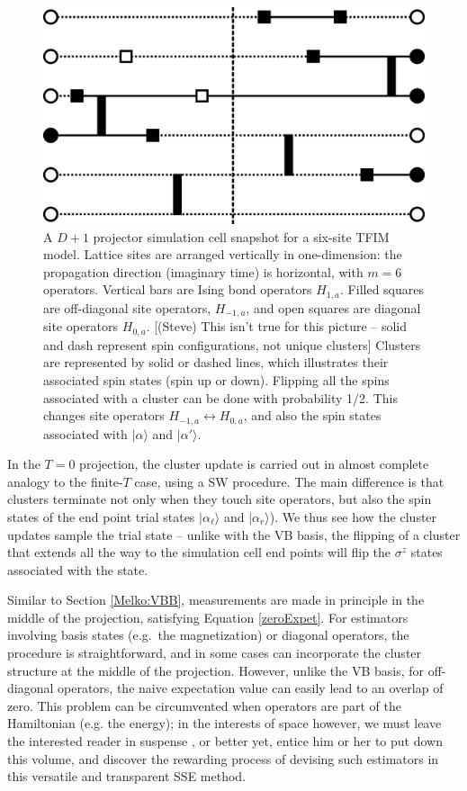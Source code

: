 \documentclass[vecphys]{svmult}
\begin{document}
\begin{figure}[t]
\centering
\includegraphics*[width=.85\textwidth]{zeroT_tfim.eps}
\caption[]{A $D+1$ projector simulation cell snapshot for a six-site TFIM model.  Lattice sites are arranged vertically in one-dimension: the propagation direction (imaginary time) is horizontal, with $m=6$ operators.  
Vertical bars are Ising bond operators $H_{1,a}$.  Filled squares are off-diagonal site operators, $H_{-1,a}$, and open squares are diagonal site operators $H_{0,a}$.
{\color{red}[(Steve) This isn't true for this picture -- solid and dash represent spin configurations, not unique clusters]} Clusters are represented by solid or dashed lines, which illustrates their associated spin states (spin up or down).  Flipping all the spins associated with a cluster can be done with probability 1/2.  This changes site operators $H_{-1,a} \leftrightarrow H_{0,a}$, and also the spin states associated with  $|\alpha \rangle$ and $|\alpha' \rangle$.}
\label{fig:5}      
\end{figure} 

In the $T=0$ projection, the cluster update is carried out in almost complete analogy to the finite-$T$ case, using a SW procedure.  The main difference is that clusters terminate not only when they touch site operators, but also the spin states of the end point trial states $|\alpha_{\ell} \rangle$ and $|\alpha_r \rangle$).  We thus see how the cluster updates sample the trial state -- unlike with the VB basis, the flipping of a cluster that extends all the way to the simulation cell end points will flip the $\sigma^z$ states associated with the state. 

Similar to Section \ref{Melko:VBB}, measurements are made in principle in the middle of the projection, satisfying Equation \ref{zeroExpet}.  
For estimators involving basis states (e.g.~the magnetization) or diagonal operators, the procedure is straightforward, and in some cases can incorporate the cluster structure at the middle of the projection.
However, unlike the VB basis, for off-diagonal operators, the naive expectation value can easily lead to an overlap of zero.  This problem can be circumvented when operators are part of the Hamiltonian (e.g. the energy); in the interests of space however, we must leave the interested reader in suspense \cite{Melko:unpub}, or better yet, entice him or her to put down this volume, and discover the rewarding process of devising such estimators in this versatile and transparent SSE method.
\end{document}
